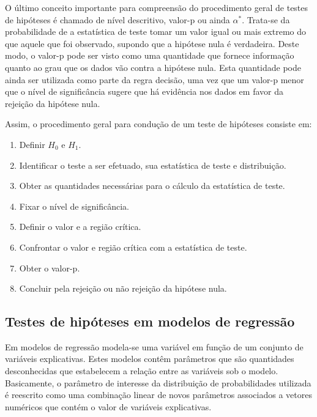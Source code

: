 O último conceito importante para compreensão do procedimento geral de  testes de hipóteses é chamado de nível descritivo, valor-p ou ainda $\alpha^*$. Trata-se da probabilidade de a estatística de teste tomar um valor igual ou mais extremo do que aquele que foi observado, supondo que a hipótese nula é verdadeira. Deste modo, o valor-p pode ser visto como uma quantidade que fornece informação quanto ao grau que os dados vão contra a hipótese nula. Esta quantidade pode ainda ser utilizada como parte da regra decisão, uma vez que um valor-p menor que o nível de significância sugere que há evidência nos dados em favor da rejeição da hipótese nula.

Assim, o procedimento geral para condução de um teste de hipóteses 
consiste em: 

\begin{enumerate}
  
  \item Definir $H_0$ e $H_1$.
  
  \item Identificar o teste a ser efetuado, sua estatística de teste e 
distribuição.
  
  \item Obter as quantidades necessárias para o cálculo da estatística de teste.
  
  \item Fixar o nível de significância.
  
  \item Definir o valor e a região crítica.
  
  \item Confrontar o valor e região crítica com a estatística de teste.
  
  \item Obter o valor-p.
  
  \item Concluir pela rejeição ou não rejeição da hipótese nula.
  
\end{enumerate}

\subsection{Testes de hipóteses em modelos de regressão}

Em modelos de regressão modela-se uma variável em função de um conjunto de variáveis explicativas. Estes modelos contêm parâmetros que são quantidades desconhecidas que estabelecem a relação entre as variáveis sob o modelo. Basicamente, o parâmetro de interesse da distribuição de probabilidades utilizada é reescrito como uma combinação linear de novos parâmetros associados a vetores numéricos que contém o valor de variáveis explicativas.

